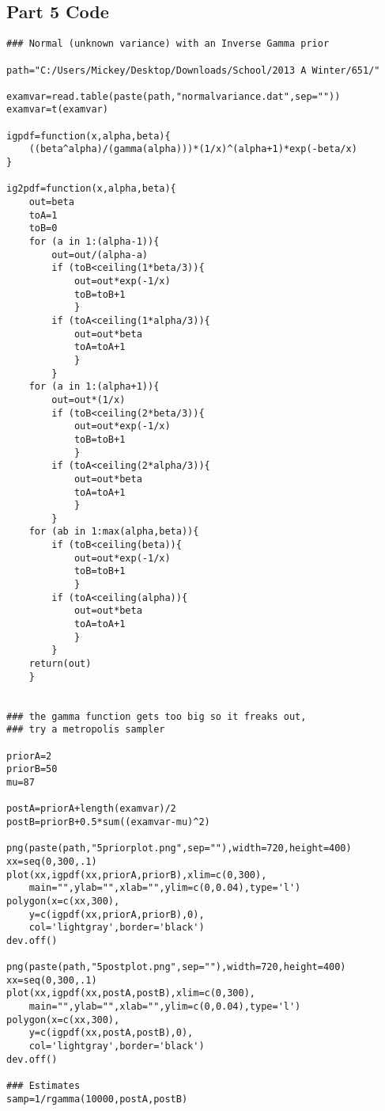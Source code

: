 \documentclass[12pt]{article}
\begin{document}
\subsection*{Part 5 Code}
\begin{scriptsize}
\begin{verbatim}
### Normal (unknown variance) with an Inverse Gamma prior

path="C:/Users/Mickey/Desktop/Downloads/School/2013 A Winter/651/"

examvar=read.table(paste(path,"normalvariance.dat",sep=""))
examvar=t(examvar)

igpdf=function(x,alpha,beta){
    ((beta^alpha)/(gamma(alpha)))*(1/x)^(alpha+1)*exp(-beta/x)
}

ig2pdf=function(x,alpha,beta){
    out=beta
    toA=1
    toB=0
    for (a in 1:(alpha-1)){
        out=out/(alpha-a)
        if (toB<ceiling(1*beta/3)){
            out=out*exp(-1/x)
            toB=toB+1
            }
        if (toA<ceiling(1*alpha/3)){
            out=out*beta
            toA=toA+1
            }
        }
    for (a in 1:(alpha+1)){
        out=out*(1/x)
        if (toB<ceiling(2*beta/3)){
            out=out*exp(-1/x)
            toB=toB+1
            }
        if (toA<ceiling(2*alpha/3)){
            out=out*beta
            toA=toA+1
            }
        }
    for (ab in 1:max(alpha,beta)){
        if (toB<ceiling(beta)){
            out=out*exp(-1/x)
            toB=toB+1
            }
        if (toA<ceiling(alpha)){
            out=out*beta
            toA=toA+1
            }
        }
    return(out)
    }


### the gamma function gets too big so it freaks out,
### try a metropolis sampler

priorA=2
priorB=50
mu=87

postA=priorA+length(examvar)/2
postB=priorB+0.5*sum((examvar-mu)^2)

png(paste(path,"5priorplot.png",sep=""),width=720,height=400)
xx=seq(0,300,.1)
plot(xx,igpdf(xx,priorA,priorB),xlim=c(0,300),
    main="",ylab="",xlab="",ylim=c(0,0.04),type='l')
polygon(x=c(xx,300),
    y=c(igpdf(xx,priorA,priorB),0),
    col='lightgray',border='black')
dev.off()

png(paste(path,"5postplot.png",sep=""),width=720,height=400)
xx=seq(0,300,.1)
plot(xx,igpdf(xx,postA,postB),xlim=c(0,300),
    main="",ylab="",xlab="",ylim=c(0,0.04),type='l')
polygon(x=c(xx,300),
    y=c(igpdf(xx,postA,postB),0),
    col='lightgray',border='black')
dev.off()

### Estimates
samp=1/rgamma(10000,postA,postB)


\end{verbatim}
\end{scriptsize}
\end{document}
